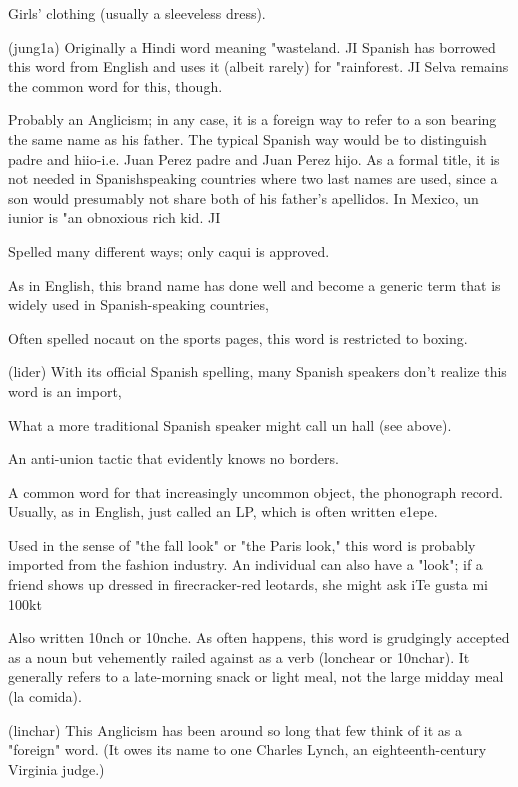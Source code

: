  Girls' clothing (usually a sleeveless dress).

 (jung1a) Originally a Hindi word meaning "wasteland. JI Spanish has borrowed this word from English and uses it (albeit
rarely) for "rainforest. JI Selva remains the common word for this, though.

 Probably an Anglicism; in any case, it is a foreign
way to refer to a son bearing the same name as his father. The typical
Spanish way would be to distinguish padre and hiio-i.e. Juan Perez
padre and Juan Perez hijo. As a formal title, it is not needed in Spanishspeaking countries where two last names are used, since a son would
presumably not share both of his father's apellidos. In Mexico, un iunior is "an obnoxious rich kid. JI

 Spelled many different ways; only caqui is approved.

 As in English, this brand name has done well
and become a generic term that is widely used in Spanish-speaking
countries,

 Often spelled nocaut on the sports pages, this
word is restricted to boxing.

 (lider) With its official Spanish spelling, many Spanish speakers don't realize this word is an import,

 What a more traditional Spanish speaker might call
un hall (see above).

 An anti-union tactic that evidently knows no
borders.

 A common word for that increasingly uncommon object, the phonograph record. Usually, as in English, just called
an LP, which is often written e1epe.

 Used in the sense of "the fall look" or "the Paris
look," this word is probably imported from the fashion industry. An
individual can also have a "look"; if a friend shows up dressed in
firecracker-red leotards, she might ask iTe gusta mi 100kt

 Also written 10nch or 10nche. As often happens, this
word is grudgingly accepted as a noun but vehemently railed against as
a verb (lonchear or 10nchar). It generally refers to a late-morning snack
or light meal, not the large midday meal (la comida).

 (linchar) This Anglicism has been around so long that
few think of it as a "foreign" word. (It owes its name to one Charles
Lynch, an eighteenth-century Virginia judge.)

